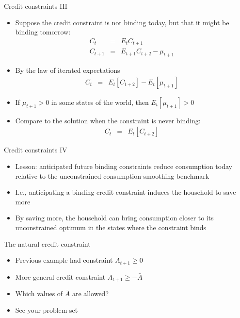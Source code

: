 \documentclass[9pt]{beamer}
\newcommand{\bit}{\begin{itemize}}
\newcommand{\eit}{\end{itemize}}
\begin{document}
\begin{frame}{Credit constraints III}

\bit
\setlength\itemsep{1em}

\item Suppose the credit constraint is not binding today, but that it might be binding tomorrow:
\begin{eqnarray}
C_{t} &=& E_t C_{t+1} \nonumber \\
C_{t+1} &=& E_{t+1} C_{t+2} - \mu_{t+1} \nonumber
\end{eqnarray}

\item By the law of iterated expectations
\begin{eqnarray}
C_{t} &=& E_t \left[ C_{t+2}\right] - E_t \left[\mu_{t+1} \right] \nonumber
\end{eqnarray}

\item If $\mu_{t+1}>0$ in some states of the world, then $E_t \left[\mu_{t+1}\right]>0$ 

\item Compare to the solution when the constraint is never binding:
\begin{eqnarray}
C_{t} &=& E_t \left[ C_{t+2}\right] \nonumber
\end{eqnarray}
\eit

\end{frame}


\begin{frame}{Credit constraints IV}

	\bit
	\setlength\itemsep{1em}
	
	\item Lesson: anticipated future binding constraints reduce consumption today relative to the unconstrained consumption-smoothing benchmark

		\item I.e., anticipating a binding credit constraint induces the household to save more
	
		\item By saving more, the household can bring consumption closer to its unconstrained optimum in the states where the constraint binds

	\eit
	
	\end{frame}


\begin{frame}{The natural credit constraint}

\bit
\setlength\itemsep{2em}

\item Previous example had constraint $A_{t+1} \geq 0$

\item More general credit constraint $A_{t+1} \geq -\bar A$ 

\item Which values of $\bar A$ are allowed?

\item See your problem set

\eit

\end{frame}
\end{document}

